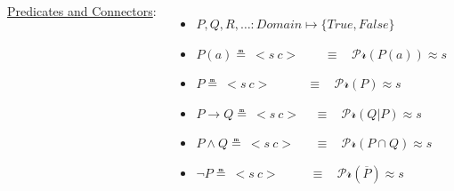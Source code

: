 \documentclass[aspectratio=169]{beamer}
\newcommand{\TTrue}{\textit{True}}
\newcommand{\TFalse}{\textit{False}}
\newcommand{\prob}[1]{\mathcal{Pr}\left(#1\right)}
\begin{document}
\begin{frame}


  \begin{columns}
    \column{7.8cm}

    \underline{Predicates and Connectors}:
    \begin{itemize}
    \item<+-> $P, Q, R, \hdots: \textit{Domain} \mapsto \{\TTrue, \TFalse\}$
    \item<+-> $P(a) \measeq\ <\!s\ c\!> \! \ \ \ \ \ \ \ \ \ \equiv \ \ \ \ \prob{P(a)} \approx s$
    \item<+-> $P \measeq\ <\!s\ c\!> \ \ \ \ \ \ \ \ \ \ \ \ \ \equiv \ \ \ \ \prob{P} \approx s$
    \item<+-> $P \rightarrow Q \measeq\ <\!s\ c\!> \ \ \ \ \ \equiv \ \ \
      \ \prob{Q|P} \approx s$
    \item<+-> $P \land Q \measeq\ <\!s\ c\!> \ \ \ \ \ \ \ \! \equiv \
      \ \ \ \prob{P \cap Q} \approx s$
    \item<+-> $\lnot P \measeq\ <\!s\ c\!> \ \ \ \ \ \ \ \ \ \ \! \
      \equiv \ \ \ \ \prob{\overline{P}} \approx s$
    \end{itemize}


\end{columns}
\end{frame}
\end{document}
